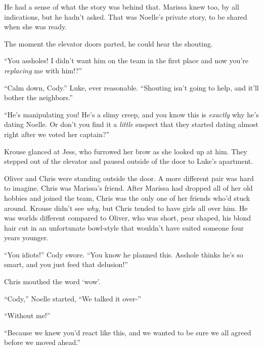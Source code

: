 He had a sense of what the story was behind that.  Marissa knew too, by all indications, but he hadn't asked.  That was Noelle's private story, to be shared when she was ready.



The moment the elevator doors parted, he could hear the shouting.



``You assholes!  I didn't want him on the team in the first place and now you're \emph{replacing} me with him!?''



``Calm down, Cody.''  Luke, ever reasonable.  ``Shouting isn't going to help, and it'll bother the neighbors.''



``He's manipulating you!  He's a slimy creep, and you know this is \emph{exactly} why he's dating Noelle.  Or don't you find it a\emph{ little} suspect that they started dating almost right after we voted her captain?''



Krouse glanced at Jess, who furrowed her brow as she looked up at him.  They stepped out of the elevator and paused outside of the door to Luke's apartment.



Oliver and Chris were standing outside the door.  A more different pair was hard to imagine.  Chris was Marissa's friend.  After Marissa had dropped all of her old hobbies and joined the team, Chris was the only one of her friends who'd stuck around.  Krouse didn't see \emph{why}, but Chris tended to have girls all over him.  He was worlds different compared to Oliver, who was short, pear shaped, his blond hair cut in an unfortunate bowl-style that wouldn't have suited someone four years younger.



``You idiots!'' Cody swore.  ``You know he planned this.  Asshole thinks he's so smart, and you just feed that delusion!''



Chris mouthed the word `wow'.



``Cody,'' Noelle started, ``We talked it over-''



``Without me!''



``Because we knew you'd react like this, and we wanted to be sure we all agreed before we moved ahead.''



